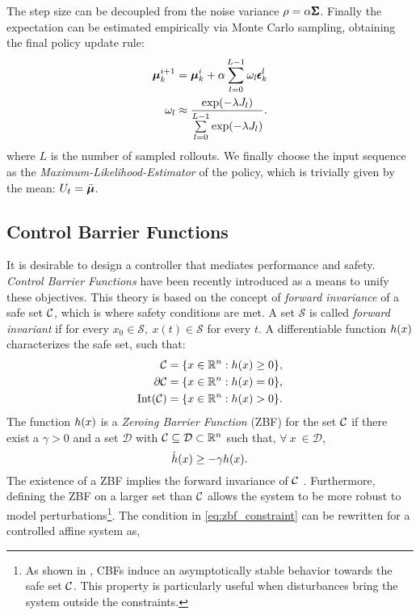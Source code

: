 The step size can be decoupled from the noise variance $\rho = \alpha \pmb{\Sigma} $. Finally the expectation can be estimated empirically via Monte Carlo sampling, obtaining the final policy update rule:
\begin{align} \label{eq:update_rule}
  \boldsymbol{\mu}^{i+1}_{k} &= \boldsymbol{\mu}^{i}_{k} + \alpha  \sum \limits_{l=0}^{L-1}  \omega_l \pmb{\epsilon}_{k}^{l} \\
  \omega_l  &\approx \frac{\exp ( -\lambda J_l )}{\sum \limits_{l=0}^{L-1} \exp ( -\lambda J_l)}. \label{eq:weighting}
\end{align}
where $L$ is the number of sampled rollouts. 
We finally choose the input sequence as the \emph{Maximum-Likelihood-Estimator} of the policy, which is trivially given by the mean: $U_t = \bar{\boldsymbol{\mu}}$.

\subsection{Control Barrier Functions}
It is desirable to design a controller that mediates performance and safety. \emph{Control Barrier Functions} have been recently introduced as a means to unify these objectives. This theory is based on the concept of \emph{forward invariance} of a safe set $\mathcal{C} $, which is where safety conditions are met. A set $\mathcal{S}$ is called \emph{forward invariant} if for every $x_0 \in \mathcal{S},\ x(t) \in \mathcal{S}$ for every $t$. A differentiable function $h(x)$  characterizes the safe set, such that:
\begin{align*}
    \mathcal{C} &= \{ x \in \mathbb{R}^{n} : h(x) \geq 0 \}, \\
    \partial \mathcal{C} &= \{ x \in \mathbb{R}^{n} : h(x) = 0 \}, \\
    \text{Int}(\mathcal{C}) &= \{ x \in \mathbb{R}^{n} : h(x) > 0 \}.
\end{align*}
The function $h(x)$ is a \emph{Zeroing Barrier Function} (ZBF) for the set $ \mathcal{C} $ if there exist a $\gamma > 0$ and a set $\mathcal{D}$ with $\mathcal{C} \subseteq \mathcal{D} \subset \mathbb{R}^{n}$ such that, $\forall \  x \  \in \mathcal{D}$, 
\begin{equation} \label{eq:zbf_constraint}
    \dot{h}(x) \geq -\gamma h(x).
\end{equation}
The existence of a ZBF implies the forward invariance of $\mathcal{C}$ \cite{ames2016control}. Furthermore, defining the ZBF on a larger set than $\mathcal{C}$ allows the system to be more robust to model perturbations\footnote{As shown in \cite{ames2016control}, CBFs induce an asymptotically stable behavior towards the safe set $\mathcal{C}$. This property is particularly useful when disturbances bring the system outside the constraints.}. The condition in \eqref{eq:zbf_constraint} can be rewritten for a controlled affine system as,

